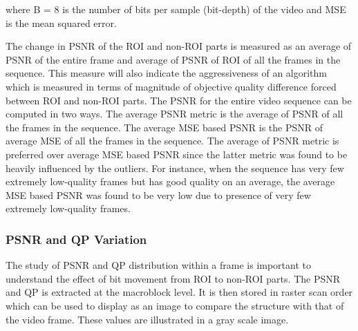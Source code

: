 \documentclass[11pt]{article} %
\begin{document}
where B = 8 is the number of bits per sample (bit-depth) of the video and MSE is the mean squared error.

The change in PSNR of the ROI and non-ROI parts is measured as an average of PSNR of the entire frame and average of PSNR of ROI of all the frames in the sequence. This measure will also indicate the aggressiveness of an algorithm which is measured in terms of magnitude of objective quality difference forced between ROI and non-ROI parts. The PSNR for the entire video sequence can be computed in two ways. The average PSNR metric is the average of PSNR of all the frames in the sequence. The average MSE based PSNR is the PSNR of average MSE of all the frames in the sequence.  The average of PSNR metric is preferred over average MSE based PSNR since the latter metric was found to be heavily influenced by the outliers. For instance, when the sequence has very few extremely low-quality frames but has good quality on an average, the average MSE based PSNR was found to be very low due to presence of very few extremely low-quality frames.

\subsubsection{PSNR and QP Variation}
The study of PSNR and QP distribution within a frame is important to understand the effect of bit movement from ROI to non-ROI parts. The PSNR and QP is extracted at the macroblock level. It is then stored in raster scan order which can be used to display as  an image to compare the structure with that of the video frame. These values are illustrated in a gray scale image. 
\end{document}
